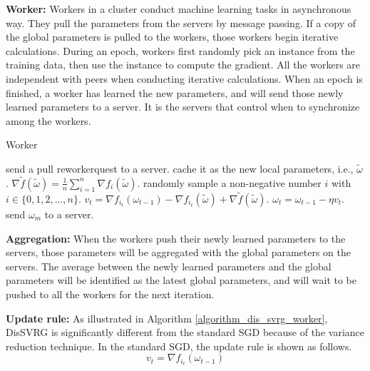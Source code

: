 \documentclass[preprint,review,11pt,a4paper]{elsarticle}
\begin{document}
\textbf{Worker:} Workers in a cluster conduct machine learning tasks in asynchronous way. They pull the parameters from the servers by message passing. If a  copy of the global parameters is pulled to the workers, those workers begin iterative calculations. During an epoch, workers first randomly pick an instance from the training data, then use the instance to compute the gradient.  All the workers are independent with peers when conducting iterative calculations. When an epoch is finished, a worker has learned the new parameters, and will send those newly learned parameters to a server. It is the servers that control when to synchronize among the workers.

\begin{algorithm}[t]
    \caption{Worker}
    \label{algorithm_dis_svrg_worker}
    \begin{algorithmic}[1]
            \State send a pull reworkerquest to a server.
                    \State cache it as the new local parameters, i.e., $\tilde{\omega}$.
                    \State $\nabla \tilde{f}(\tilde{\omega})=\frac{1}{n}\sum\limits_{i=1}^n\nabla f_i(\tilde{\omega})$.
                       \State randomly sample a non-negative number $i$ with $i\in\{0,1, 2,...,n\}$.
	              \State $v_t=\nabla f_{i_t}(\omega_{t-1})-\nabla f_{i_t}(\tilde{\omega})+\nabla \tilde{f}(\tilde{\omega})$.
	              \State $\omega_t=\omega_{t-1}-\eta v_t$.
                    \EndFor
                    \State send  $\omega_m$ to a server.
               \EndIf
        \EndWhile
      \EndWhile
    \end{algorithmic}
\end{algorithm}

\textbf{Aggregation:} When the workers push their newly learned parameters to the servers, those parameters will be aggregated with the global parameters on the servers. The average between the newly learned parameters and the global parameters will be identified as the latest global parameters, and will wait to be pushed to all the workers for the next iteration.

\textbf{Update rule:} As illustrated in Algorithm \ref{algorithm_dis_svrg_worker}, DisSVRG is significantly different from the standard SGD because of the variance reduction technique. In the standard SGD, the update rule is shown as follows.
\begin{equation}
\label{standard_sgd}
v_t=\nabla f_{i_t}(\omega_{t-1})
\end{equation}
\end{document}
